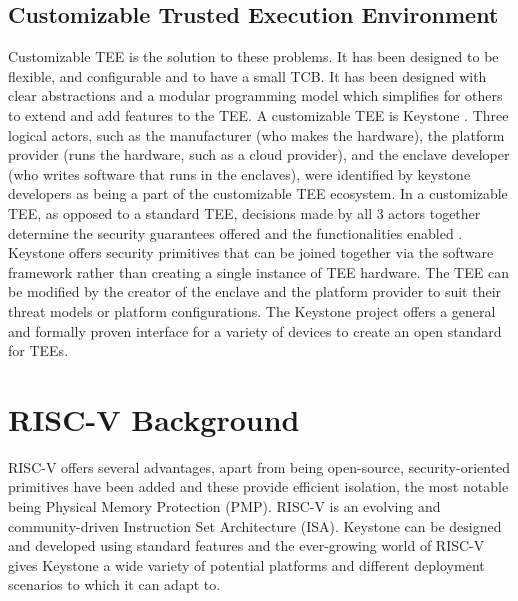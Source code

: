\subsection{Customizable Trusted Execution Environment}
Customizable TEE is the solution to these problems. It has been designed to be flexible, and configurable and to have a small TCB. It has been designed with clear abstractions and a modular programming model which simplifies for others to extend and add features to the TEE. A customizable TEE is Keystone \cite{lee2020keystone}. Three logical actors, such as the manufacturer (who makes the hardware), the platform provider (runs the hardware, such as a cloud provider), and the enclave developer (who writes software that runs in the enclaves), were identified by keystone developers as being a part of the customizable TEE ecosystem. In a customizable TEE, as opposed to a standard TEE, decisions made by all 3 actors together determine the security guarantees offered and the functionalities enabled \cite{keysyone-blog-1}. 
Keystone offers security primitives that can be joined together via the software framework rather than creating a single instance of TEE hardware. The TEE can be modified by the creator of the enclave and the platform provider to suit their threat models or platform configurations. The Keystone project offers a general and formally proven interface for a variety of devices to create an open standard for TEEs. 

\section{RISC-V Background}
RISC-V offers several advantages, apart from being open-source, security-oriented primitives have been added and these provide efficient isolation, the most notable being Physical Memory Protection (PMP). RISC-V is an evolving and community-driven Instruction Set Architecture (ISA). Keystone can be designed and developed using standard features and the ever-growing world of RISC-V gives Keystone a wide variety of potential platforms and different deployment scenarios to which it can adapt to. \cite{keysyone-blog-2}


